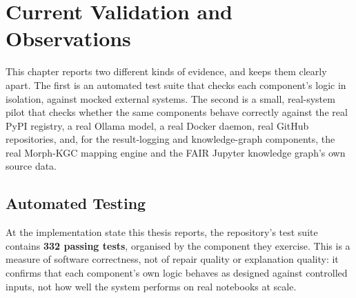 \chapter{Current Validation and Observations}
\label{chap:validation}

This chapter reports two different kinds of evidence, and keeps them
clearly apart. The first is an automated test suite that checks each
component's logic in isolation, against mocked external systems. The
second is a small, real-system pilot that checks whether the same
components behave correctly against the real PyPI registry, a real Ollama
model, a real Docker daemon, real GitHub repositories, and, for the
result-logging and knowledge-graph components, the real Morph-KGC mapping
engine and the FAIR Jupyter knowledge graph's own source data.


\section{Automated Testing}
\label{sec:v-testing}

At the implementation state this thesis reports, the repository's test
suite contains \textbf{332 passing tests}, organised by the component they
exercise. This is a measure of software correctness, not of repair quality
or explanation quality: it confirms that each component's own logic behaves
as designed against controlled inputs, not how well the system performs on
real notebooks at scale.

